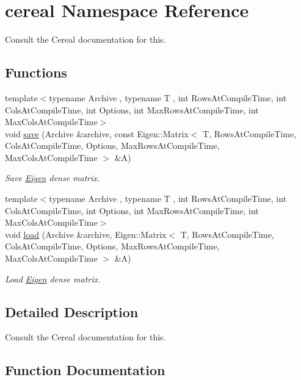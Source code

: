 \hypertarget{namespacecereal}{}\section{cereal Namespace Reference}
\label{namespacecereal}


Consult the Cereal documentation for this.  


\subsection*{Functions}
\begin{DoxyCompactItemize}
\item 
{\footnotesize template$<$typename Archive , typename T , int Rows\+At\+Compile\+Time, int Cols\+At\+Compile\+Time, int Options, int Max\+Rows\+At\+Compile\+Time, int Max\+Cols\+At\+Compile\+Time$>$ }\\void \hyperlink{namespacecereal_afd0f4831f36c8d183e4ff80c96b6b9ed}{save} (Archive \&archive, const Eigen\+::\+Matrix$<$ T, Rows\+At\+Compile\+Time, Cols\+At\+Compile\+Time, Options, Max\+Rows\+At\+Compile\+Time, Max\+Cols\+At\+Compile\+Time $>$ \&A)
\begin{DoxyCompactList}\small\item\em Save \hyperlink{namespaceEigen}{Eigen} dense matrix. \end{DoxyCompactList}\item 
{\footnotesize template$<$typename Archive , typename T , int Rows\+At\+Compile\+Time, int Cols\+At\+Compile\+Time, int Options, int Max\+Rows\+At\+Compile\+Time, int Max\+Cols\+At\+Compile\+Time$>$ }\\void \hyperlink{namespacecereal_a62dfe53ce43ad27c02ca954e9da31dc5}{load} (Archive \&archive, Eigen\+::\+Matrix$<$ T, Rows\+At\+Compile\+Time, Cols\+At\+Compile\+Time, Options, Max\+Rows\+At\+Compile\+Time, Max\+Cols\+At\+Compile\+Time $>$ \&A)
\begin{DoxyCompactList}\small\item\em Load \hyperlink{namespaceEigen}{Eigen} dense matrix. \end{DoxyCompactList}\end{DoxyCompactItemize}


\subsection{Detailed Description}
Consult the Cereal documentation for this. 

\subsection{Function Documentation}
\mbox{\label{namespacecereal_a62dfe53ce43ad27c02ca954e9da31dc5}} 
